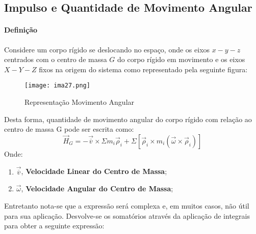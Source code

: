 \documentclass{article}
\begin{document}
        \subsection{Impulso e Quantidade de Movimento Angular}
            \paragraph{Definição}Considere um corpo rígido se deslocando no espaço, onde os eixos $x-y-z$ centrados com o centro de massa $G$ do corpo rígido em movimento e os eixos $X-Y-Z$ fixos na origem do sistema como representado pela seguinte figura:
                \begin{figure}[H]
                    \centering
                    \texttt{[image: ima27.png]}
                    \caption{Representação Movimento Angular}
                \end{figure}\noindent
            Desta forma, quantidade de movimento angular do corpo rígido com relação ao centro de massa G pode ser escrita como:
                \begin{equation}
                    \boxed{
                        \vec{H}_{G} = 
                        -\vec{\overline{v}}\times\Sigma m_{i}\vec{\rho}_{i} + 
                        \Sigma
                        \left[
                            \vec{\rho}_{i}\times m_{i} (\vec{\omega}\times\vec{\rho}_{i})
                        \right]
                    }
                \end{equation}
            Onde:
                \begin{enumerate}[rightmargin = \leftmargin, noitemsep]
                    \item $\vec{\overline{v}}$, \textbf{Velocidade Linear do Centro de Massa};
                    \item $\vec{\omega}$, \textbf{Velocidade Angular do Centro de Massa};
                \end{enumerate}
            Entretanto nota-se que a expressão será complexa e, em muitos casos, não útil para sua aplicação. Desvolve-se os somatórios através da aplicação de integrais para obter a seguinte expressão:
\end{document}

